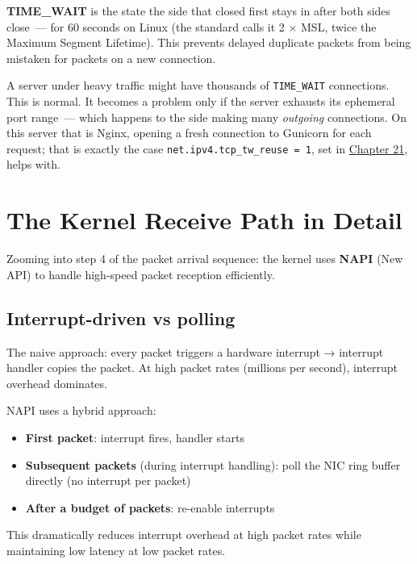 \textbf{TIME\_WAIT} is the state the side that closed first stays in after both sides close~--- for 60 seconds on Linux (the standard calls it 2 × MSL, twice the Maximum Segment Lifetime). This prevents delayed duplicate packets from being mistaken for packets on a new connection.

A server under heavy traffic might have thousands of \texttt{TIME\_WAIT} connections. This is normal. It becomes a problem only if the server exhausts its ephemeral port range~--- which happens to the side making many \emph{outgoing} connections. On this server that is Nginx, opening a fresh connection to Gunicorn for each request; that is exactly the case \texttt{net.}\allowbreak{}\texttt{ipv4.}\allowbreak{}\texttt{tcp\_}\allowbreak{}\texttt{tw\_}\allowbreak{}\texttt{reuse\ =}\allowbreak{}\texttt{\ 1}, set in \hyperref[ch:21-system-setup]{Chapter 21}, helps with.

\setcounter{section}{4}
\section{The Kernel Receive Path in Detail}\label{26-network-stack-flow:265-the-kernel-receive-path-in-detail}

Zooming into step 4 of the packet arrival sequence: the kernel uses \textbf{NAPI} (New API) to handle high-speed packet reception efficiently.

\subsection*{Interrupt-driven vs polling}\label{26-network-stack-flow:interrupt-driven-vs-polling}

The naive approach: every packet triggers a hardware interrupt → interrupt handler copies the packet. At high packet rates (millions per second), interrupt overhead dominates.

NAPI uses a hybrid approach:

\begin{itemize}
\tightlist
\item
  \textbf{First packet}: interrupt fires, handler starts
\item
  \textbf{Subsequent packets} (during interrupt handling): poll the NIC ring buffer directly (no interrupt per packet)
\item
  \textbf{After a budget of packets}: re-enable interrupts
\end{itemize}

\noindent{}This dramatically reduces interrupt overhead at high packet rates while maintaining low latency at low packet rates.

